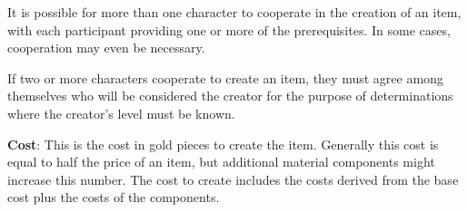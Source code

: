 It is possible for more than one character to cooperate in the creation of an item, with each participant providing one or more of the prerequisites. In some cases, cooperation may even be necessary.
				
If two or more characters cooperate to create an item, they must agree among themselves who will be considered the creator for the purpose of determinations where the creator's level must be known.
				
\textbf{Cost}: This is the cost in gold pieces to create the item. Generally this cost is equal to half the price of an item, but additional material components might increase this number. The cost to create includes the costs derived from the base cost plus the costs of the components.
			













